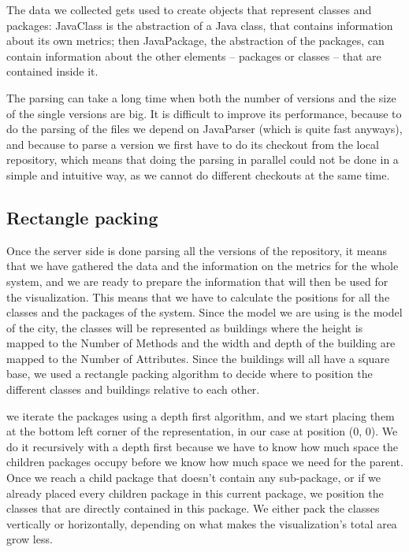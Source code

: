 \documentclass[]{usiinfbachelorproject}
\begin{document}
The data we collected gets used to create objects that represent classes and packages: JavaClass is the abstraction of a Java class, that contains information about its own metrics; then JavaPackage, the abstraction of the packages, can contain information about the other elements -- packages or classes -- that are contained inside it.

The parsing can take a long time when both the number of versions and the size of the single versions are big.
It is difficult to improve its performance, because to do the parsing of the files we depend on JavaParser (which is quite fast anyways), and because to parse a version we first have to do its checkout from the local repository, which means that doing the parsing in parallel could not be done in a simple and intuitive way, as we cannot do different checkouts at the same time.

\subsection{Rectangle packing} \label{Rectangle packing}
Once the server side is done parsing all the versions of the repository, it means that we have gathered the data and the information on the metrics for the whole system, and we are ready to prepare the information that will then be used for the visualization. This means that we have to calculate the positions for all the classes and the packages of the system. Since the model we are using is the model of the city, the classes will be represented as buildings where the height is mapped to the Number of Methods and the width and depth of the building are mapped to the Number of Attributes. Since the buildings will all have a square base, we used a rectangle packing algorithm to decide where to position the different classes and buildings relative to each other.

we iterate the packages using a depth first algorithm, and we start placing them at the bottom left corner of the representation, in our case at position (0, 0). We do it recursively with a depth first because we have to know how much space the children packages occupy before we know how much space we need for the parent.
Once we reach a child package that doesn't contain any sub-package, or if we already placed every children package in this current package, we position the classes that are directly contained in this package. We either pack the classes vertically or horizontally, depending on what makes the visualization's total area grow less.
\end{document}
